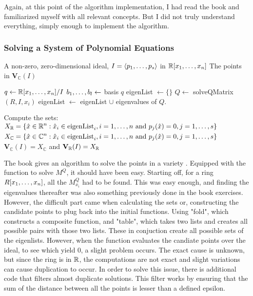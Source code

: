 Again, at this point of the algorithm implementation, I had read the book and familiarized myself with all relevant concepts. But I did not truly understand everything, simply enough to implement the algorithm. 

\subsubsection{Solving a System of Polynomial Equations}
\label{sssec:solving-system-polynomial-equations}

\begin{algorithm}[ht]
\caption{Solution of a system of polynomial equations}
\begin{algorithmic}[1]
\Require A non-zero, zero-dimensional ideal, $I = \langle p_1, \dots, p_s \rangle$ in $\mathbb{R}[x_1, \dots, x_n]$
\Ensure The points in \textbf{V}$_{\mathbb{C}}(I)$

\State $ q \gets \mathbb{R}[x_1, \dots, x_n] / I$
\State $b_1, \dots, b_l \gets$ basis $q$
\State eigenList $\gets \lbrace \rbrace$
    \State $Q \gets $ solveQMatrix$(R,I, x_i)$
    \State eigenList $\gets$ eigenList $\cup$ eigenvalues of $Q$.
\EndFor

\State Compute the sets: \\
$\begin{aligned}
    X_{\mathbb{R}} &= \left\{ \hat{x} \in \mathbb{R}^n : \hat{x}_i \in \text{eigenList}_i, i = 1, \dots, n \text{ and } p_j(\hat{x}) = 0, j = 1, \dots ,s \right\} \\
    X_{\mathbb{C}} &= \left\{ \hat{x} \in \mathbb{C}^n : \hat{x}_i \in \text{eigenList}_i, i = 1, \dots, n \text{ and } p_j(\hat{x}) = 0, j = 1, \dots ,s \right\}
\end{aligned}$
\State \Return $\textbf{V}_{\mathbb{C}}(I) = X_{\mathbb{C}}$ and  $\textbf{V}_{\mathbb{R}}(I) = X_{\mathbb{R}}$
\end{algorithmic}
\end{algorithm}

The book \cite{Applied} gives an algorithm to solve the points in a variety . Equipped with the function to solve $M^Q$, it should have been easy. Starting off, for a ring $R[x_1, \dots, x_n]$, all the $M_{x_i}^Q$ had to be found. This was easy enough, and finding the eigenvalues thereafter was also something previously done in the book exercises. However, the difficult part came when calculating the sets or, constructing the candidate points to plug back into the initial functions. Using "fold", which constructs a composite function, and "table", which takes two lists and creates all possible pairs with those two lists. These in conjuction create all possible sets of the eigenlists. However, when the function evaluates the candiate points over the ideal, to see which yield 0, a slight problem occurs. The exact cause is unknown, but since the ring is in $\mathbb{R}$, the computations are not exact and slight variations can cause duplication to occur. In order to solve this issue, there is additional code that filters almost duplicate solutions. This filter works by ensuring that the sum of the distance between all the points is lesser than a defined epsilon. 
